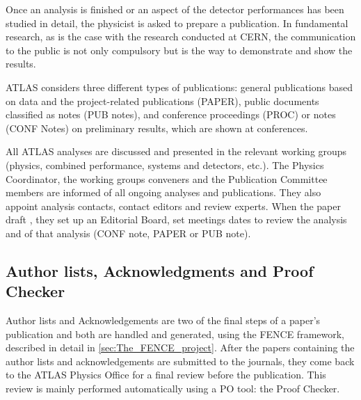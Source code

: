 Once an analysis is finished or an aspect of the detector performances has been studied in detail,
the physicist is asked to prepare a publication.
In fundamental research, as is the case with the research conducted at CERN, the communication to the public is not only compulsory but is the  way to demonstrate and show the results.

ATLAS considers three different types of publications: general publications based on data and the project-related publications (PAPER), public documents classified as notes (PUB notes), and conference proceedings (PROC) or notes (CONF Notes) on preliminary results, which are shown at conferences.
                    
All ATLAS analyses are discussed and presented in the relevant working groups (physics, combined performance, systems and detectors, etc.). The Physics Coordinator, the working groups conveners and the Publication Committee members are informed of all ongoing analyses and publications. They also appoint analysis contacts, contact editors and review experts.
When the paper draft ,
they set up an Editorial Board, set meetings dates to review the analysis and  of that analysis (CONF note, PAPER or PUB note).


\subsection{Author lists, Acknowledgments and Proof Checker}%
\label{sec:Authorlists_acknowledgments_and_ProofChecker}

Author lists and Acknowledgements are two of the final steps of a paper’s publication and both are handled and generated, using the FENCE framework, described in detail in \cref{sec:The_FENCE_project}.
After the papers containing the author lists and acknowledgements are submitted to the journals,
they come back to the ATLAS Physics Office for a final review before the publication.
This review is mainly performed automatically using a PO tool: the Proof Checker.
                                                           
